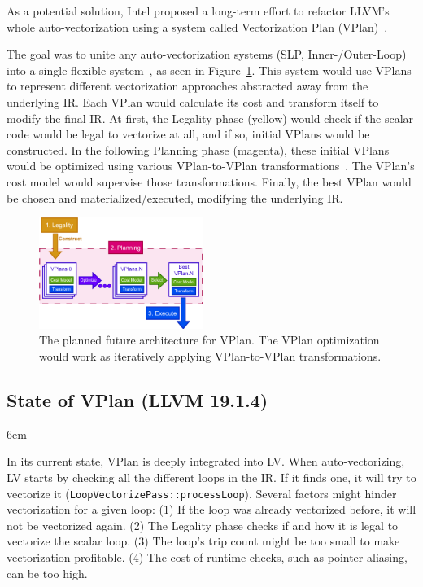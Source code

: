 \documentclass[sigplan,11pt,nonacm]{acmart}
\begin{document}
As a potential solution, Intel proposed a long-term effort to refactor LLVM's whole auto-vectorization
using a system called Vectorization Plan (VPlan)~\cite{llvmextloopvec}.

The goal was to unite any auto-vectorization systems (SLP, Inner-/Outer-Loop) into a single flexible
system~\cite{llvmintrvplan,llvmvplanstate}, as seen in Figure~\ref{fig:vplan-future}. This system would 
use VPlans to represent different 
vectorization approaches abstracted away from the underlying IR. Each VPlan would 
calculate its cost and transform itself to modify the final IR. At first, the Legality phase (yellow) 
would check if the scalar code would be legal to vectorize at all, and if so, initial VPlans would 
be constructed. In the following Planning phase (magenta), these initial VPlans would be optimized 
using various VPlan-to-VPlan transformations~\cite{llvmouterloopstatus}. 
The VPlan's cost model would supervise those transformations. Finally, the best VPlan would be chosen 
and materialized/executed, modifying the underlying IR.

\begin{figure}
  \centering
  \includegraphics[width=0.475\textwidth]{images/vplan-future.png}
  \caption{The planned future architecture for VPlan. The VPlan optimization would
  work as iteratively applying VPlan-to-VPlan transformations.}
  \label{fig:vplan-future}
\end{figure}

\subsection{State of VPlan (LLVM 19.1.4)}
\emergencystretch 6em

In its current state, VPlan is deeply integrated into LV.
When auto-vectorizing, LV starts by checking all the different loops in the IR.
If it finds one, it will try to vectorize it (\texttt{LoopVectorizePass::\allowbreak processLoop}).
Several factors might hinder vectorization for a given loop: 
(1) If the loop was already vectorized before, it will not be vectorized again. 
(2) The Legality phase checks if and how it is legal to vectorize the scalar
loop. (3) The loop's trip count might be too small to make vectorization profitable. (4) The cost 
of runtime checks, such as pointer aliasing, can be too high.
\end{document}
